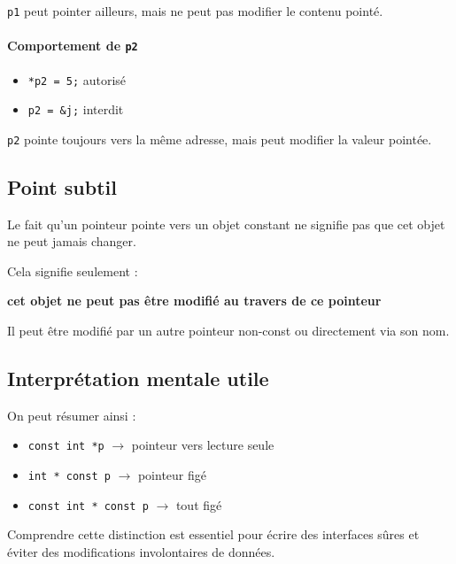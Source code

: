 \texttt{p1} peut pointer ailleurs,
mais ne peut pas modifier le contenu pointé.

\paragraph{Comportement de \texttt{p2}}

\begin{itemize}
    \item \texttt{*p2 = 5;} \hspace{1em} autorisé
    \item \texttt{p2 = \&j;} \hspace{1.3em} interdit
\end{itemize}

\texttt{p2} pointe toujours vers la même adresse,
mais peut modifier la valeur pointée.

\subsection{Point subtil}

Le fait qu’un pointeur pointe vers un objet constant
ne signifie pas que cet objet ne peut jamais changer.

Cela signifie seulement :

\begin{center}
\textbf{cet objet ne peut pas être modifié au travers de ce pointeur}
\end{center}

Il peut être modifié par un autre pointeur non-const
ou directement via son nom.

\subsection{Interprétation mentale utile}

On peut résumer ainsi :

\begin{itemize}
    \item \texttt{const int *p} \hspace{1em} $\rightarrow$ pointeur vers lecture seule
    \item \texttt{int * const p} \hspace{1em} $\rightarrow$ pointeur figé
    \item \texttt{const int * const p} $\rightarrow$ tout figé
\end{itemize}

Comprendre cette distinction est essentiel
pour écrire des interfaces sûres
et éviter des modifications involontaires de données.

